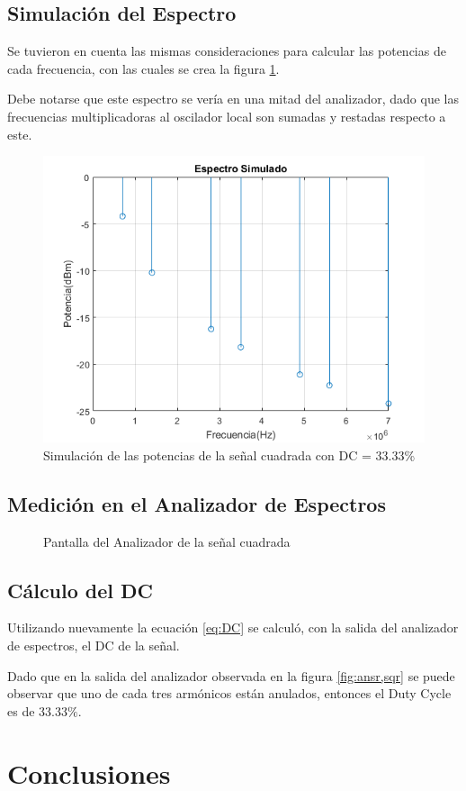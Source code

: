     \subsection{Simulación del Espectro}
    Se tuvieron en cuenta las mismas consideraciones para calcular las potencias de cada
    frecuencia, con las cuales se crea la figura \ref{fig:2,3,2}.

    Debe notarse que este espectro se vería en una mitad del analizador,
    dado que las frecuencias multiplicadoras al oscilador local son sumadas
    y restadas respecto a este.

    \begin{figure}[ht]
        \begin{center}
            \includegraphics[width=0.75\linewidth]{contenido/img/spect_sqr33.png}
            \caption{Simulación de las potencias de la señal cuadrada con DC = 33.33\%}
            \label{fig:2,3,2}
        \end{center}
    \end{figure}

    \subsection{Medición en el Analizador de Espectros}

    \begin{figure}[ht]
        \begin{center}
            \caption{Pantalla del Analizador de la señal cuadrada}
            \label{fig:ansr,sqr33}
        \end{center}
    \end{figure}

    \subsection{Cálculo del DC}
    Utilizando nuevamente la ecuación \ref{eq:DC} se calculó, con la salida del analizador
    de espectros, el DC de la señal.

    Dado que en la salida del analizador observada en la figura \ref{fig:ansr,sqr}
    se puede observar que uno de cada tres armónicos están anulados, entonces el
    Duty Cycle es de $33.33 \%$.
\section{Conclusiones}